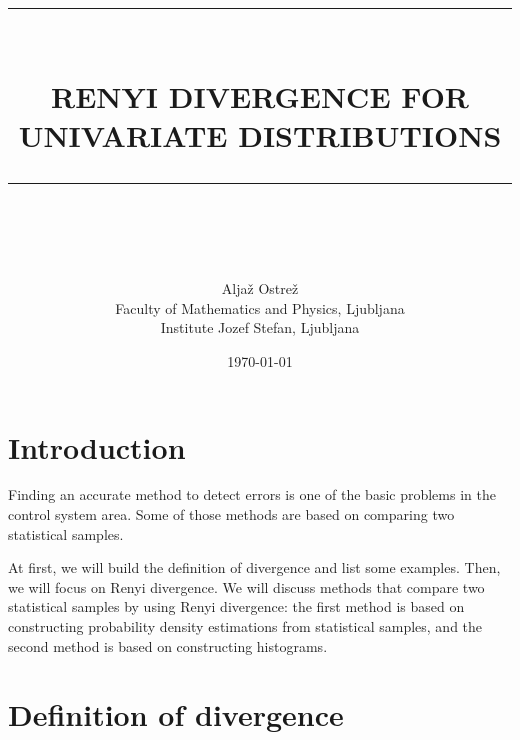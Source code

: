 \documentclass[a4paper, 12pt]{article}
\newcommand{\HRule}[1]{\rule{\linewidth}{#1}}
\theoremstyle{definition}
\begin{document}
\title{ \normalsize \textsc{}
        \\ [2.0cm]
        \HRule{2pt} \\
        \LARGE \textbf{\uppercase{Renyi divergence for univariate distributions}}
        \HRule{2pt} \\ [0.5cm]
        \normalsize \vspace*{5\baselineskip}}

\date{\today}

\author{
        Aljaž Ostrež \\ 
		Faculty of Mathematics and Physics, Ljubljana \\ 
		Institute Jozef Stefan, Ljubljana \\}

\maketitle
\thispagestyle{empty}
\newpage

\setcounter{page}{1}


\tableofcontents
\newpage


\section{Introduction}

Finding an accurate method to detect errors is one of the basic problems in the control system area. Some of those methods are based on comparing two statistical samples.

At first, we will build the definition of divergence and list some examples. Then, we will focus on Renyi divergence. We will discuss methods that compare two statistical samples by using Renyi divergence: the first method is based on constructing probability density estimations from statistical samples, and the second method is based on constructing histograms.

\section{Definition of divergence}
\end{document}
